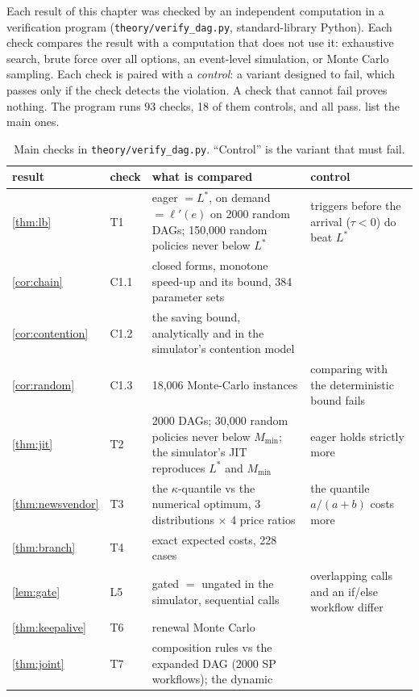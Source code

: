 Each result of this chapter was checked by an independent computation in a verification program
(\texttt{theory/verify\_dag.py}, standard-library Python). Each check compares the result with a
computation that does not use it: exhaustive search, brute force over all options, an event-level
simulation, or Monte Carlo sampling. Each check is paired with a \emph{control}: a variant designed
to fail, which passes only if the check detects the violation. A check that cannot fail proves
nothing. The program runs 93 checks, 18 of them controls, and all pass.
 list the main ones.

\begin{table}[t]
\centering
\caption{Main checks in \texttt{theory/verify\_dag.py}. ``Control'' is the variant that must
fail.}
\label{tab:checks}
\small
\begin{tabular}{@{}p{}p{}p{}p{}@{}}
\toprule
result & check & what is compared & control \\
\midrule
\cref{thm:lb} & T1 & eager $= L^*$, on demand $= \ell'(e)$ on 2000 random DAGs; 150{,}000
  random policies never below $L^*$ & triggers before the arrival ($\tau < 0$) do beat $L^*$ \\
\cref{cor:chain} & C1.1 & closed forms, monotone speed-up and its bound, 384 parameter sets & \\
\cref{cor:contention} & C1.2 & the saving bound, analytically and in the simulator's contention
  model & \\
\cref{cor:random} & C1.3 & 18{,}006 Monte-Carlo instances & comparing with the deterministic
  bound fails \\
\cref{thm:jit} & T2 & 2000 DAGs; 30{,}000 random policies never below $M_{\min}$; the simulator's
  JIT reproduces $L^*$ and $M_{\min}$ & eager holds strictly more \\
\cref{thm:newsvendor} & T3 & the $\kappa$-quantile vs the numerical optimum, 3 distributions
  $\times$ 4 price ratios & the quantile $a/(a+b)$ costs more \\
\cref{thm:branch} & T4 & exact expected costs, 228 cases & \\
\cref{lem:gate} & L5 & gated $=$ ungated in the simulator, sequential calls & overlapping calls
  and an if/else workflow differ \\
\cref{thm:keepalive} & T6 & renewal Monte Carlo & \\
\cref{thm:joint} & T7 & composition rules vs the expanded DAG (2000 SP workflows); the dynamic

\end{tabular}
\end{table}
